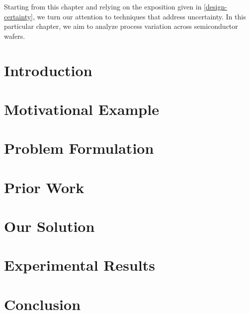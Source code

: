 Starting from this chapter and relying on the exposition given in
\cref{design-certainty}, we turn our attention to techniques that address
uncertainty. In this particular chapter, we aim to analyze process variation
across semiconductor wafers.

\section{Introduction}

\section{Motivational Example}

\section{Problem Formulation}

\section{Prior Work}

\section{Our Solution}

\section{Experimental Results}

\section{Conclusion}
